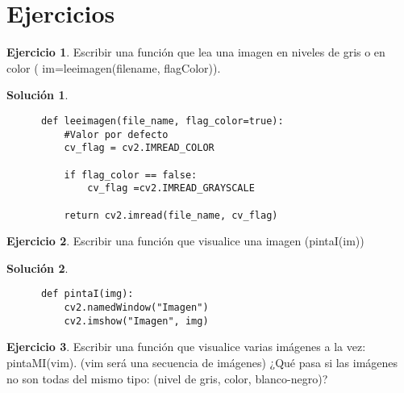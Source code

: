 \documentclass[a4paper, 11pt]{article}
\theoremstyle{definition}
\newtheorem{ejercicio}{Ejercicio}
\newtheorem*{solucion}{Solución}
\begin{document}
  \section{Ejercicios}

  \begin{ejercicio}
      Escribir una función que lea una imagen en niveles de gris o en color ( im=leeimagen(filename, flagColor)).
  \end{ejercicio}

  \begin{solucion}
      \leavevmode
      \begin{lstlisting}
      def leeimagen(file_name, flag_color=true):
          #Valor por defecto
          cv_flag = cv2.IMREAD_COLOR

          if flag_color == false:
              cv_flag =cv2.IMREAD_GRAYSCALE

          return cv2.imread(file_name, cv_flag)
      \end{lstlisting}
  \end{solucion}

  \begin{ejercicio}
      Escribir una función que visualice una imagen (pintaI(im))
  \end{ejercicio}

  \begin{solucion}
      \leavevmode
      \begin{lstlisting}
      def pintaI(img):
          cv2.namedWindow("Imagen")
          cv2.imshow("Imagen", img)
      \end{lstlisting}
  \end{solucion}

  \begin{ejercicio}
      Escribir una función que visualice varias imágenes a la vez: pintaMI(vim). (vim será una secuencia de imágenes) ¿Qué pasa si las imágenes no son todas del mismo tipo: (nivel de gris, color, blanco-negro)?
  \end{ejercicio}
\end{document}
